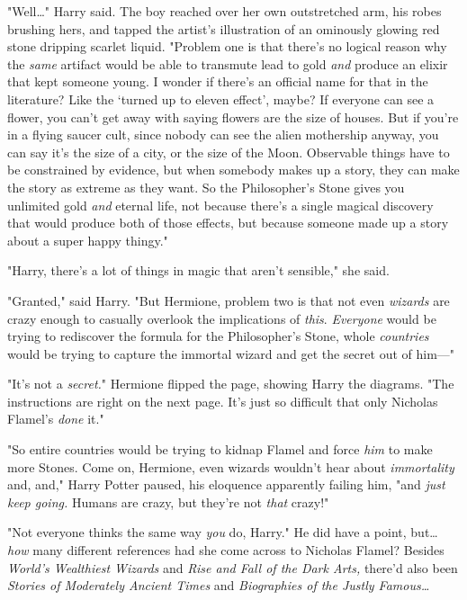 "Well{\ldots}" Harry said. The boy reached over her own outstretched arm, his 
robes brushing hers, and tapped the artist's illustration of an ominously 
glowing red stone dripping scarlet liquid. "Problem one is that there's no 
logical reason why the \emph{same} artifact would be able to transmute lead to 
gold \emph{and} produce an elixir that kept someone young. I wonder if there's 
an official name for that in the literature? Like the `turned up to eleven 
effect', maybe? If everyone can see a flower, you can't get away with saying 
flowers are the size of houses. But if you're in a flying saucer cult, since 
nobody can see the alien mothership anyway, you can say it's the size of a 
city, or the size of the Moon. Observable things have to be constrained by 
evidence, but when somebody makes up a story, they can make the story as 
extreme as they want. So the Philosopher's Stone gives you unlimited gold 
\emph{and} eternal life, not because there's a single magical discovery that 
would produce both of those effects, but because someone made up a story about 
a super happy thingy."

"Harry, there's a lot of things in magic that aren't sensible," she said.

"Granted," said Harry. "But Hermione, problem two is that not even 
\emph{wizards} are crazy enough to casually overlook the implications of 
\emph{this}. \emph{Everyone} would be trying to rediscover the formula for the 
Philosopher's Stone, whole \emph{countries} would be trying to capture the 
immortal wizard and get the secret out of him---"

"It's not a \emph{secret.}" Hermione flipped the page, showing Harry the 
diagrams. "The instructions are right on the next page. It's just so difficult 
that only Nicholas Flamel's \emph{done} it."

"So entire countries would be trying to kidnap Flamel and force \emph{him} to 
make more Stones. Come on, Hermione, even wizards wouldn't hear about 
\emph{immortality} and, and," Harry Potter paused, his eloquence apparently 
failing him, "and \emph{just keep going.} Humans are crazy, but they're not 
\emph{that} crazy!"

"Not everyone thinks the same way \emph{you} do, Harry." He did have a point, 
but{\ldots} \emph{how} many different references had she come across to 
Nicholas Flamel? Besides \emph{World's Wealthiest Wizards} and \emph{Rise and 
Fall of the Dark Arts,} there'd also been \emph{Stories of Moderately Ancient 
Times} and \emph{Biographies of the Justly Famous{\ldots}}

